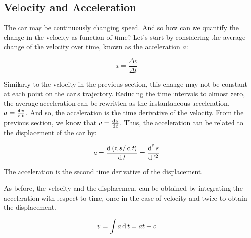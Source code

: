 \subsection{Velocity and Acceleration}

The car may be continuously changing speed. And so how can we quantify the change in the velocity as function of time? Let's start by considering the average change of the velocity over time, known as the acceleration $a$:

\begin{equation}

a = \frac{\Delta v}{\Delta t} 

\end{equation}

\nl

Similarly to the velocity in the previous section, this change may not be constant at each point on the car's trajectory. Reducing the time intervals to almost zero, the average acceleration can be rewritten as the instantaneous acceleration, $a = \frac{\operatorname{d} v}{\operatorname{d} t}$. And so, the acceleration is the time derivative of the velocity. From the previous section, we know that $v = \frac{\operatorname{d} s}{\operatorname{d} t}$. Thus, the acceleration can be related to the displacement of the car by:

 \begin{equation}

a = \frac{\d \left(\d s/ \d t\right)}{\d t} = \frac{\d^2 s}{\d t^2} 

\end{equation}

 The acceleration is the second time derivative of the displacement. 

\nll


\nl

As before, the velocity and the displacement can be obtained by integrating the acceleration with respect to time, once in the case of velocity and twice to obtain the displacement.

  \begin{equation}

v = \int a \d t = at + c

\label{vel}

\end{equation}

